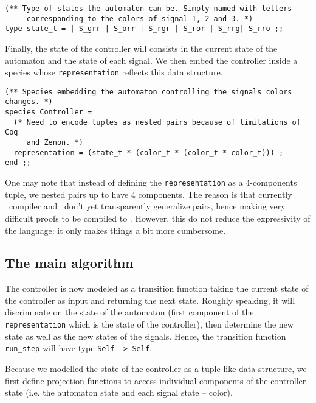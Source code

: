 {\scriptsize
\begin{lstlisting}
(** Type of states the automaton can be. Simply named with letters
     corresponding to the colors of signal 1, 2 and 3. *)
type state_t = | S_grr | S_orr | S_rgr | S_ror | S_rrg| S_rro ;;
\end{lstlisting}}

Finally, the state of the controller will consists in the current
state of the automaton and the state of each signal. We then embed
the controller inside a species whose \lstinline"representation"
reflects this data structure.

{\scriptsize
\begin{lstlisting}
(** Species embedding the automaton controlling the signals colors changes. *)
species Controller =
  (* Need to encode tuples as nested pairs because of limitations of  Coq
     and Zenon. *)
  representation = (state_t * (color_t * (color_t * color_t))) ;
end ;;
\end{lstlisting}}

One may note that instead of defining the \lstinline"representation"
as a 4-components tuple, we nested pairs up to have 4 components. The
reason is that currently \focal\ compiler and \zenon\ don't yet
transparently generalize pairs, hence making very difficult proofs to
be compiled to \coq. However, this do not reduce the expressivity of
the language: it only makes things a bit more cumbersome.

\subsection{The main algorithm}
The controller is now modeled as a transition function taking the
current state of the controller as input and returning the next
state. Roughly speaking, it will discriminate on the state of the
automaton (first component of the \lstinline"representation" which is
the state of the controller), then determine the new state as well as
the new states of the signals. Hence, the transition function \lstinline"run_step"
will have type \lstinline"Self -> Self".

Because we modelled the state of the controller as a tuple-like data
structure, we first define projection functions to access individual
components of the controller state (i.e. the automaton state and each
signal state -- color).

{\scriptsize
}

